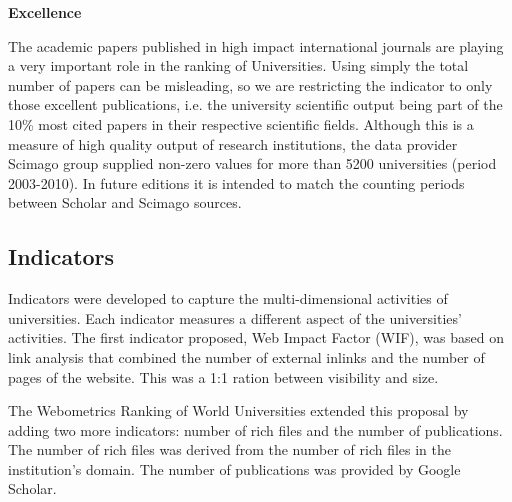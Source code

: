 \noindent
\textbf{Excellence}

\noindent
The academic papers published in high impact international journals are playing a very important role in the ranking of Universities. Using simply the total number of papers can be misleading, so we are restricting the indicator to only those excellent publications, i.e. the university scientific output being part of the 10\% most cited papers in their respective scientific fields. Although this is a measure of high quality output of research institutions, the data provider Scimago group supplied non-zero values for more than 5200 universities (period 2003-2010). In future editions it is intended to match the counting periods between Scholar and Scimago sources.

\subsection*{Indicators}

\noindent
Indicators were developed to capture the multi-dimensional activities of universities. Each indicator measures a different aspect of the universities' activities. The first indicator proposed, Web Impact Factor (WIF), was based on link analysis that combined the number of external inlinks and the number of pages of the website. This was a 1:1 ration between visibility and size. 

\noindent
The Webometrics Ranking of World Universities extended this proposal by adding two more indicators: number of rich files and the number of publications. The number of rich files was derived from the number of rich files in the institution's domain. The number of publications was provided by Google Scholar.

